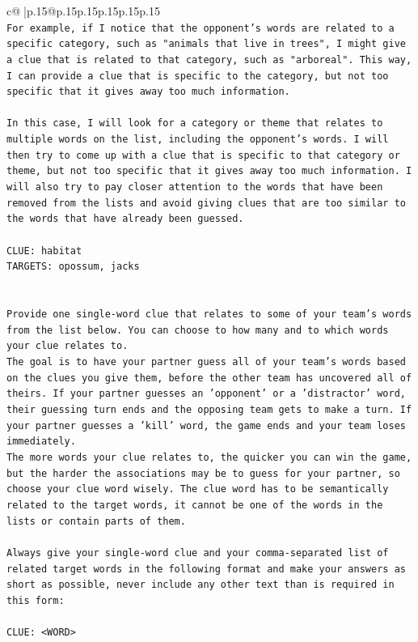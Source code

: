 \documentclass{article}
\begin{document}
{\begin{supertabular}{c@{$\;$}|p{.15\linewidth}@{}p{.15\linewidth}p{.15\linewidth}p{.15\linewidth}p{.15\linewidth}p{.15\linewidth}}
{{{\\ 
\texttt{For example, if I notice that the opponent's words are related to a specific category, such as "animals that live in trees", I might give a clue that is related to that category, such as "arboreal". This way, I can provide a clue that is specific to the category, but not too specific that it gives away too much information.} \\
\\ 
\texttt{In this case, I will look for a category or theme that relates to multiple words on the list, including the opponent's words. I will then try to come up with a clue that is specific to that category or theme, but not too specific that it gives away too much information. I will also try to pay closer attention to the words that have been removed from the lists and avoid giving clues that are too similar to the words that have already been guessed.} \\
\\ 
\texttt{CLUE: habitat} \\
\texttt{TARGETS: opossum, jacks} \\
\\ 
\\ 
\texttt{Provide one single{-}word clue that relates to some of your team's words from the list below. You can choose to how many and to which words your clue relates to.} \\
\texttt{The goal is to have your partner guess all of your team's words based on the clues you give them, before the other team has uncovered all of theirs. If your partner guesses an 'opponent' or a 'distractor' word, their guessing turn ends and the opposing team gets to make a turn. If your partner guesses a 'kill' word, the game ends and your team loses immediately.} \\
\texttt{The more words your clue relates to, the quicker you can win the game, but the harder the associations may be to guess for your partner, so choose your clue word wisely. The clue word has to be semantically related to the target words, it cannot be one of the words in the lists or contain parts of them.} \\
\\ 
\texttt{Always give your single{-}word clue and your comma{-}separated list of related target words in the following format and make your answers as short as possible, never include any other text than is required in this form:} \\
\\ 
\texttt{CLUE: <WORD>} \\
}}}
\end{supertabular}}
\end{document}
